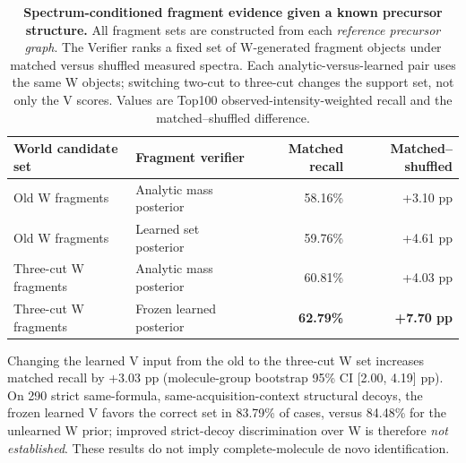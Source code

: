 \begin{table}[!htbp]
\centering
\caption{\textbf{Spectrum-conditioned fragment evidence given a known precursor structure.} All fragment sets are constructed from each \emph{reference precursor graph}. The Verifier ranks a fixed set of W-generated fragment objects under matched versus shuffled measured spectra. Each analytic-versus-learned pair uses the same W objects; switching two-cut to three-cut changes the support set, not only the V scores. Values are Top100 observed-intensity-weighted recall and the matched--shuffled difference.}
\label{tab:msdev_verifier}
\small
\begin{tabular}{llrr}
\toprule
World candidate set & Fragment verifier & Matched recall & Matched--shuffled \\
\midrule
Old W fragments & Analytic mass posterior & 58.16\% & +3.10 pp \\
Old W fragments & Learned set posterior & 59.76\% & +4.61 pp \\
Three-cut W fragments & Analytic mass posterior & 60.81\% & +4.03 pp \\
Three-cut W fragments & Frozen learned posterior & \textbf{62.79\%} & \textbf{+7.70 pp} \\
\bottomrule
\end{tabular}

\vspace{3pt}
\begin{minipage}{0.97\linewidth}\footnotesize
Changing the learned V input from the old to the three-cut W set increases matched recall by +3.03 pp (molecule-group bootstrap 95\% CI [2.00, 4.19] pp). On 290 strict same-formula, same-acquisition-context structural decoys, the frozen learned V favors the correct set in 83.79\% of cases, versus 84.48\% for the unlearned W prior; improved strict-decoy discrimination over W is therefore \emph{not established}. These results do not imply complete-molecule de novo identification.
\end{minipage}
\end{table}

